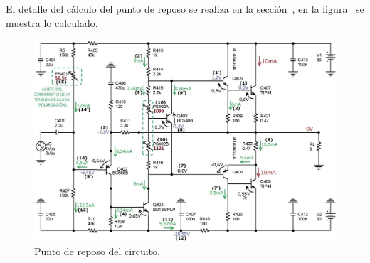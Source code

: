 \vspace{1.5cm}

El detalle del cálculo del punto de reposo se realiza en la sección~, en la figura~ se muestra lo calculado.


\begin{figure}[H] %
\begin{center}
\includegraphics[width=0.9 \textwidth, angle=0]{./img/qpoint/polarizacion_calculada.png}
\caption{\label{fig:fig_calculated_qpoint}\footnotesize{Punto de reposo del circuito.}}
\end{center}
\end{figure}


\vfill

\clearpage
